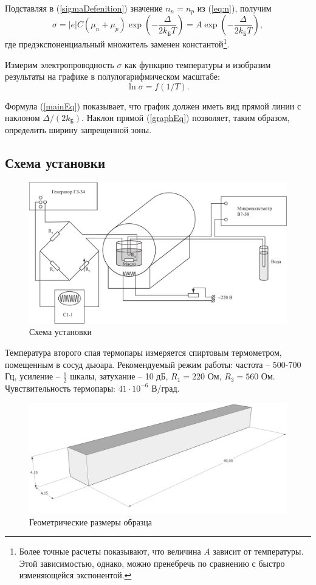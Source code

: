 \documentclass[a4paper, 12pt]{article}
\begin{document}
	Подставляя в (\ref{sigmaDefenition}) значение $n_n=n_p$ из (\ref{eq:n}), получим
	\begin{equation}
		\sigma=|e|C\left(\mu_n+\mu_p\right)\exp{\left(-\frac{\Delta}{2k_{\text{Б}}T}\right)}=A\exp{\left(-\frac{\Delta}{2k_{\text{Б}}T}\right)},
		\label{mainEq}
	\end{equation}
	где предэкспоненциальный множитель заменен константой\footnote{Более точные расчеты показывают, что величина $A$ зависит от температуры. Этой зависимостью, однако, можно пренебречь по сравнению с быстро изменяющейся экспонентой.}.

	Измерим электропроводность $\sigma$ как функцию температуры и изобразим результаты на графике в полулогарифмическом масштабе:
	\begin{equation}
		\ln\sigma=f(1/T).
		\label{graphEq}
	\end{equation}

	Формула (\ref{mainEq}) показывает, что график должен иметь вид прямой линии с наклоном $\Delta/(2k_{\text{Б}})$. Наклон прямой (\ref{graphEq}) позволяет, таким образом, определить ширину запрещенной зоны.
	\subsection{Схема установки}
	\begin{figure}[!htb]
		\centering
		\includegraphics[scale=0.6]{scheme.pdf}
		\caption{Схема установки}
	\end{figure}
	Температура второго спая термопары измеряется спиртовым термометром, помещенным в сосуд дьюара. Рекомендуемый режим работы: частота -- 500-700 Гц, усиление -- $\frac{1}{2}$ шкалы, затухание -- 10 дБ, $R_1=220$ Ом, $R_3=560$ Ом. Чувствительность термопары: $41\cdot10^{-6}$ В/град.
	\begin{figure}[!htb]
		\centering
		\includegraphics[scale=0.2]{box.png}
		\caption{Геометрические размеры образца}
	\end{figure}
\end{document}
